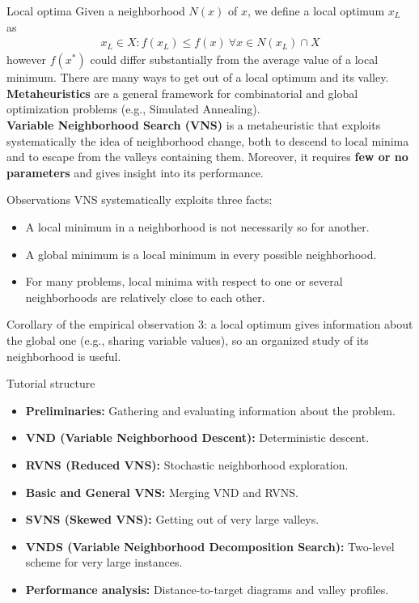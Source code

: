 \documentclass{beamer}
\begin{document}
\begin{frame}{Local optima}
\quad Given a neighborhood $N(x)$ of $x$, we define a local optimum $x_{L}$ as
\begin{gather*}
    x_{L} \in X : f(x_{L}) \leq f(x) \ \forall x \in N(x_{L}) \cap X
\end{gather*} 
however $f(x^{*})$ could differ substantially from the average value of a local minimum. There are many ways to get out of a local optimum and its valley. \\
\vspace{0.2cm}
\textbf{Metaheuristics} are a general framework for combinatorial and global optimization problems (e.g., Simulated Annealing). \\
\vspace{0.2cm}
\textbf{Variable Neighborhood Search (VNS)} is a metaheuristic that exploits systematically the idea of neighborhood change, both to descend to local minima and to escape from the valleys containing them. Moreover, it requires \textbf{few or no parameters} and gives insight into its performance.
\end{frame}

\begin{frame}{Observations}
VNS systematically exploits three facts:
\vspace{0.2cm}
\begin{itemize}
\item A local minimum in a neighborhood is not necessarily so for another.
\item A global minimum is a local minimum in every possible neighborhood.
\item For many problems, local minima with respect to one or several neighborhoods are relatively close to each other.
\end{itemize}

\vspace{0.3cm}
Corollary of the empirical observation 3: a local optimum gives information about the global one (e.g., sharing variable values), so an organized study of its neighborhood is useful.
\end{frame}

\begin{frame}{Tutorial structure}
\begin{itemize}
\item \textbf{Preliminaries:} Gathering and evaluating information about the problem.
\item \textbf{VND (Variable Neighborhood Descent):} Deterministic descent.
\item \textbf{RVNS (Reduced VNS):} Stochastic neighborhood exploration.
\item \textbf{Basic and General VNS:} Merging VND and RVNS.
\item \textbf{SVNS (Skewed VNS):} Getting out of very large valleys.
\item \textbf{VNDS (Variable Neighborhood Decomposition Search):} Two-level scheme for very large instances.
\item \textbf{Performance analysis:} Distance-to-target diagrams and valley profiles.
\end{itemize}
\end{frame}
\end{document}
